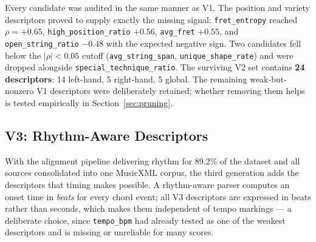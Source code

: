 Every candidate was audited in the same manner as V1. The position and variety descriptors proved to supply exactly the missing signal: \texttt{fret\_entropy} reached $\rho = +0.65$, \texttt{high\_position\_ratio} $+0.56$, \texttt{avg\_fret} $+0.55$, and \texttt{open\_string\_ratio} $-0.48$ with the expected negative sign. Two candidates fell below the $|\rho| < 0.05$ cutoff (\texttt{avg\_string\_span}, \texttt{unique\_shape\_rate}) and were dropped alongside \texttt{special\_technique\_ratio}. The surviving V2 set contains \textbf{24 descriptors}: 14 left-hand, 5 right-hand, 5 global. The remaining weak-but-nonzero V1 descriptors were deliberately retained; whether removing them helps is tested empirically in Section~\ref{sec:pruning}.

\subsection{V3: Rhythm-Aware Descriptors}
\label{sec:v3_features}
With the alignment pipeline delivering rhythm for 89.2\% of the dataset and all sources consolidated into one MusicXML corpus, the third generation adds the descriptors that timing makes possible. A rhythm-aware parser computes an onset time in \emph{beats} for every chord event; all V3 descriptors are expressed in beats rather than seconds, which makes them independent of tempo markings --- a deliberate choice, since \texttt{tempo\_bpm} had already tested as one of the weakest descriptors and is missing or unreliable for many scores.

